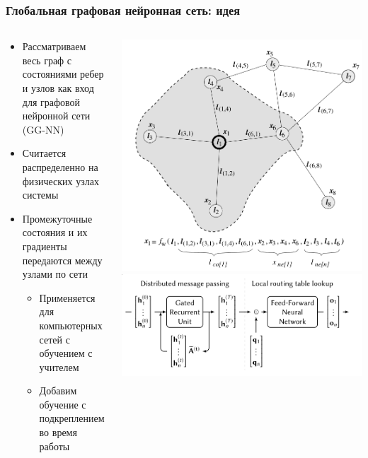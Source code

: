 \documentclass{beamer}
\begin{document}
\begin{frame}
  \frametitle{Глобальная графовая нейронная сеть: идея}
  \begin{columns}
    \begin{column}{0.6\textwidth}
      \begin{itemize}
      \item Рассматриваем весь граф с состояниями ребер и узлов как вход для
        графовой нейронной сети (GG-NN)
      \item Считается распределенно на физических узлах системы
      \item Промежуточные состояния и их градиенты передаются между узлами по
        сети 
        \begin{itemize}
        \item Применяется для компьютерных сетей с обучением с учителем\footnotemark
        \item Добавим обучение с подкреплением во время работы
        \end{itemize} 
      \end{itemize}
    \end{column}
    \begin{column}{0.4\textwidth}
      \begin{center}
        \includegraphics[width=\textwidth]{gnn.png}
        \includegraphics[width=\textwidth]{gg-qnn.png}

\end{center}
\end{column}
\end{columns}
\end{frame}
\end{document}
